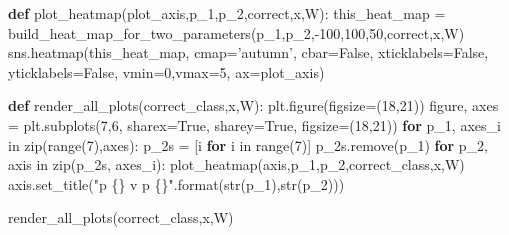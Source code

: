 \documentclass[]{report}
\newenvironment{Shaded}{}{}
\newcommand{\KeywordTok}[1]{\textcolor[rgb]{0.00,0.44,0.13}{\textbf{{#1}}}}
\newcommand{\DecValTok}[1]{\textcolor[rgb]{0.25,0.63,0.44}{{#1}}}
\newcommand{\StringTok}[1]{\textcolor[rgb]{0.25,0.44,0.63}{{#1}}}
\newcommand{\VariableTok}[1]{\textcolor[rgb]{0.10,0.09,0.49}{{#1}}}
\newcommand{\ControlFlowTok}[1]{\textcolor[rgb]{0.00,0.44,0.13}{\textbf{{#1}}}}
\newcommand{\OperatorTok}[1]{\textcolor[rgb]{0.40,0.40,0.40}{{#1}}}
\newcommand{\BuiltInTok}[1]{{#1}}
\newcommand{\NormalTok}[1]{{#1}}
\begin{document}
\begin{Shaded}
\begin{Highlighting}[]
\KeywordTok{def} \NormalTok{plot_heatmap(plot_axis,p_1,p_2,correct,x,W):}
    \NormalTok{this_heat_map }\OperatorTok{=} \NormalTok{build_heat_map_for_two_parameters(p_1,p_2,}\OperatorTok{-}\DecValTok{100}\NormalTok{,}\DecValTok{100}\NormalTok{,}\DecValTok{50}\NormalTok{,correct,x,W)}
    \NormalTok{sns.heatmap(this_heat_map,}
                \NormalTok{cmap}\OperatorTok{=}\StringTok{'autumn'}\NormalTok{, }
                \NormalTok{cbar}\OperatorTok{=}\VariableTok{False}\NormalTok{, }
                \NormalTok{xticklabels}\OperatorTok{=}\VariableTok{False}\NormalTok{, }
                \NormalTok{yticklabels}\OperatorTok{=}\VariableTok{False}\NormalTok{, }
                \NormalTok{vmin}\OperatorTok{=}\DecValTok{0}\NormalTok{,vmax}\OperatorTok{=}\DecValTok{5}\NormalTok{,}
                \NormalTok{ax}\OperatorTok{=}\NormalTok{plot_axis)}
    
\KeywordTok{def} \NormalTok{render_all_plots(correct_class,x,W):}
    \NormalTok{plt.figure(figsize}\OperatorTok{=}\NormalTok{(}\DecValTok{18}\NormalTok{,}\DecValTok{21}\NormalTok{))}
    \NormalTok{figure, axes }\OperatorTok{=} \NormalTok{plt.subplots(}\DecValTok{7}\NormalTok{,}\DecValTok{6}\NormalTok{, sharex}\OperatorTok{=}\VariableTok{True}\NormalTok{, sharey}\OperatorTok{=}\VariableTok{True}\NormalTok{, figsize}\OperatorTok{=}\NormalTok{(}\DecValTok{18}\NormalTok{,}\DecValTok{21}\NormalTok{))}
    \ControlFlowTok{for} \NormalTok{p_1, axes_i }\OperatorTok{in} \BuiltInTok{zip}\NormalTok{(}\BuiltInTok{range}\NormalTok{(}\DecValTok{7}\NormalTok{),axes):        }
        \NormalTok{p_2s }\OperatorTok{=} \NormalTok{[i }\ControlFlowTok{for} \NormalTok{i }\OperatorTok{in} \BuiltInTok{range}\NormalTok{(}\DecValTok{7}\NormalTok{)]}
        \NormalTok{p_2s.remove(p_1) }
        \ControlFlowTok{for} \NormalTok{p_2, axis }\OperatorTok{in} \BuiltInTok{zip}\NormalTok{(p_2s, axes_i):}
            \NormalTok{plot_heatmap(axis,p_1,p_2,correct_class,x,W)}
            \NormalTok{axis.set_title(}\StringTok{"p \{\} v p \{\}"}\NormalTok{.}\BuiltInTok{format}\NormalTok{(}\BuiltInTok{str}\NormalTok{(p_1),}\BuiltInTok{str}\NormalTok{(p_2)))}
\end{Highlighting}
\end{Shaded}

\begin{Shaded}
\begin{Highlighting}[]
\NormalTok{render_all_plots(correct_class,x,W)}
\end{Highlighting}
\end{Shaded}
\end{document}
